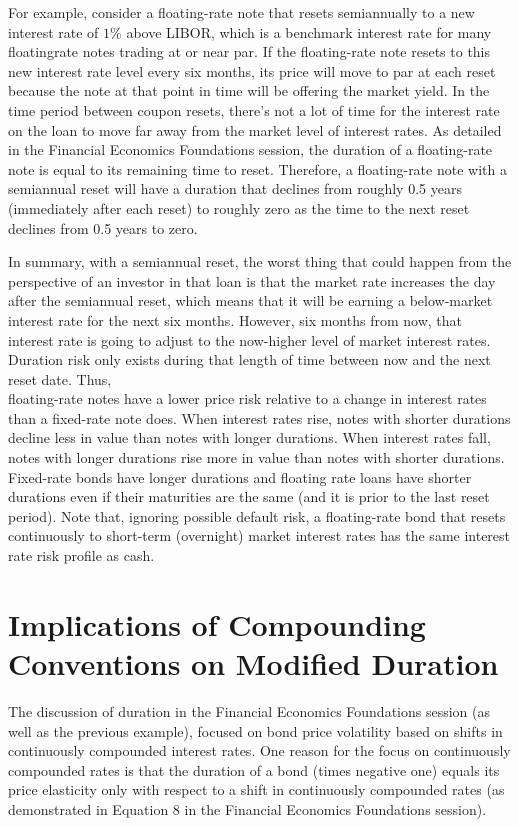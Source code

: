 \documentclass[11pt]{article}
\begin{document}
For example, consider a floating-rate note that resets semiannually to a new interest rate of $1 \%$ above LIBOR, which is a benchmark interest rate for many floatingrate notes trading at or near par. If the floating-rate note resets to this new interest rate level every six months, its price will move to par at each reset because the note at that point in time will be offering the market yield. In the time period between coupon resets, there's not a lot of time for the interest rate on the loan to move far away from the market level of interest rates. As detailed in the Financial Economics Foundations session, the duration of a floating-rate note is equal to its remaining time to reset. Therefore, a floating-rate note with a semiannual reset will have a duration that declines from roughly 0.5 years (immediately after each reset) to roughly zero as the time to the next reset declines from 0.5 years to zero.

In summary, with a semiannual reset, the worst thing that could happen from the perspective of an investor in that loan is that the market rate increases the day after the semiannual reset, which means that it will be earning a below-market interest rate for the next six months. However, six months from now, that interest rate is going to adjust to the now-higher level of market interest rates. Duration risk only exists during that length of time between now and the next reset date. Thus,\\
floating-rate notes have a lower price risk relative to a change in interest rates than a fixed-rate note does. When interest rates rise, notes with shorter durations decline less in value than notes with longer durations. When interest rates fall, notes with longer durations rise more in value than notes with shorter durations. Fixed-rate bonds have longer durations and floating rate loans have shorter durations even if their maturities are the same (and it is prior to the last reset period). Note that, ignoring possible default risk, a floating-rate bond that resets continuously to short-term (overnight) market interest rates has the same interest rate risk profile as cash.

\section*{Implications of Compounding Conventions on Modified Duration}
The discussion of duration in the Financial Economics Foundations session (as well as the previous example), focused on bond price volatility based on shifts in continuously compounded interest rates. One reason for the focus on continuously compounded rates is that the duration of a bond (times negative one) equals its price elasticity only with respect to a shift in continuously compounded rates (as demonstrated in Equation 8 in the Financial Economics Foundations session).
\end{document}
